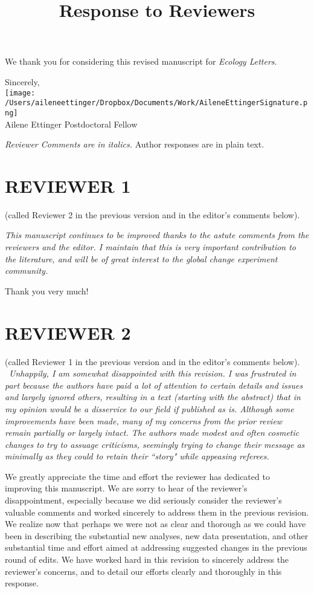 \documentclass[11pt,a4paper]{letter}
\begin{document}
\begin{letter}{}
We thank you for considering this revised manuscript for \emph{Ecology Letters}.

Sincerely,\\

\texttt{[image: /Users/aileneettinger/Dropbox/Documents/Work/AileneEttingerSignature.png]} \\
Ailene Ettinger
Postdoctoral Fellow

\clearpage

\title{Response to Reviewers}
 \emph{Reviewer Comments are in italics.} Author responses are in plain text.

\section {REVIEWER 1} (called Reviewer 2 in the previous version and in the editor's comments below).

\emph{This manuscript continues to be improved thanks to the astute comments from the reviewers and the editor.  I maintain  that this is very important contribution to the literature, and will be of great interest to the global change experiment community.} 

\par Thank you very much!

\section {REVIEWER 2} (called Reviewer 1 in the previous version and in the editor's comments below).
\\\
\emph{Unhappily, I am somewhat disappointed with this revision. I was frustrated in
part because the authors have paid a lot of attention to certain details and
issues and largely ignored others, resulting in a text (starting with the abstract)
that in my opinion would be a disservice to our field if published as is.
Although some improvements have been made, many of my concerns from
the prior review remain partially or largely intact. The authors made modest
and often cosmetic changes to try to assuage criticisms, seemingly trying to
change their message as minimally as they could to retain their ``story" while
appeasing referees.}

\par We greatly appreciate the time and effort the reviewer has dedicated to improving this manuscript.
We are sorry to hear of the reviewer's disappointment, especially because we did seriously consider the reviewer's valuable comments and worked sincerely to address them in the previous revision. We realize now that perhaps we were not as clear and thorough as we could have been in describing the substantial new analyses, new data presentation, and other substantial time and effort aimed at addressing suggested changes in the previous round of edits. We have worked hard in this revision to sincerely address the reviewer's concerns, and to detail our efforts clearly and thoroughly in this response. 


\end{letter}
\end{document}
